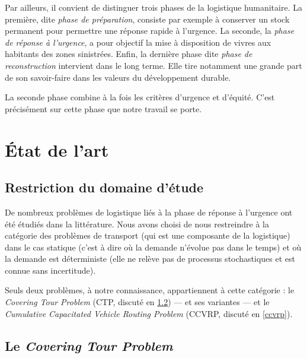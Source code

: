 \documentclass[5p,authoryear,square]{elsarticle}
\begin{document}
Par ailleurs, il convient de distinguer trois phases de la logistique humanitaire. La première, dite \emph{phase de préparation}, consiste par exemple à conserver un stock permanent pour permettre une réponse rapide à l’urgence. La seconde, la \emph{phase de réponse à l'urgence}, a pour objectif  la mise à disposition de vivres aux habitants des zones sinistrées. Enfin, la dernière phase dite  \emph{phase de reconstruction} intervient dans le long terme. Elle tire notamment une grande part de son savoir-faire dans les valeurs du développement durable.

La seconde phase combine à la fois les critères d'urgence et d'équité. C'est précisément sur cette phase que notre travail se porte.

%
%

\section{État de l'art} \label{etat_art}
\subsection{Restriction du domaine d'étude}
De nombreux problèmes de logistique liés à la phase de réponse à l'urgence ont été étudiés dans la littérature. Nous avons choisi de nous restreindre à la catégorie des problèmes de transport (qui est une composante de la logistique) dans le cas statique (c'est à dire où la demande n'évolue pas dans le temps) et où la demande est déterministe (elle ne relève pas de processus stochastiques et est connue sans incertitude).

Seuls deux problèmes, à notre connaissance, appartiennent à cette catégorie : le \emph{Covering Tour Problem} (CTP, discuté en \cref{ctp}) — et ses variantes — et le \emph{Cumulative Capacitated Vehicle Routing Problem} (CCVRP, discuté en \cref{ccvrp}).


\subsection{Le \emph{Covering Tour Problem}} \label{ctp}
\end{document}
